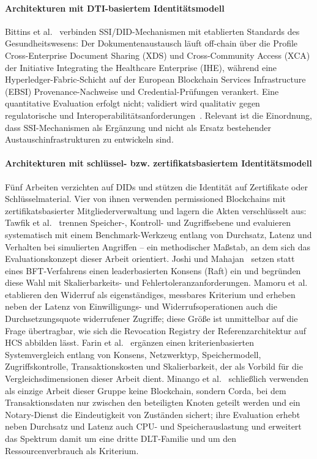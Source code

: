 \paragraph{Architekturen mit DTI-basiertem Identitätsmodell}
\label{par:literatur_dti}

Bittins et al.~\cite{bittins2021} verbinden SSI/DID-Mechanismen mit etablierten Standards des Gesundheitswesens: Der Dokumentenaustausch läuft off-chain über die Profile Cross-Enterprise Document Sharing (XDS) und Cross-Community Access (XCA) der Initiative Integrating the Healthcare Enterprise (IHE), während eine Hyperledger-Fabric-Schicht auf der European Blockchain Services Infrastructure (EBSI) Provenance-Nachweise und Credential-Prüfungen verankert. Eine quantitative Evaluation erfolgt nicht; validiert wird qualitativ gegen regulatorische und Interoperabilitätsanforderungen~\cite{bittins2021}. Relevant ist die Einordnung, dass SSI-Mechanismen als Ergänzung und nicht als Ersatz bestehender Austauschinfrastrukturen zu entwickeln sind.

\paragraph{Architekturen mit schlüssel- bzw. zertifikatsbasiertem Identitätsmodell}
\label{par:literatur_schluessel}

Fünf Arbeiten verzichten auf DIDs und stützen die Identität auf Zertifikate oder Schlüsselmaterial. Vier von ihnen verwenden permissioned Blockchains mit zertifikatsbasierter Mitgliederverwaltung und lagern die Akten verschlüsselt aus: Tawfik et al.~\cite{tawfik2025} trennen Speicher-, Kontroll- und Zugriffsebene und evaluieren systematisch mit einem Benchmark-Werkzeug entlang von Durchsatz, Latenz und Verhalten bei simulierten Angriffen -- ein methodischer Maßstab, an dem sich das Evaluationskonzept dieser Arbeit orientiert. Joshi und Mahajan~\cite{joshimahajan2025} setzen statt eines BFT-Verfahrens einen leaderbasierten Konsens (Raft) ein und begründen diese Wahl mit Skalierbarkeits- und Fehlertoleranzanforderungen. Mamoru et al.~\cite{mamoru2026} etablieren den Widerruf als eigenständiges, messbares Kriterium und erheben neben der Latenz von Einwilligungs- und Widerrufsoperationen auch die Durchsetzungsquote widerrufener Zugriffe; diese Größe ist unmittelbar auf die Frage übertragbar, wie sich die Revocation Registry der Referenzarchitektur auf HCS abbilden lässt. Farin et al.~\cite{farin2025} ergänzen einen kriterienbasierten Systemvergleich entlang von Konsens, Netzwerktyp, Speichermodell, Zugriffskontrolle, Transaktionskosten und Skalierbarkeit, der als Vorbild für die Vergleichsdimensionen dieser Arbeit dient. Minango et al.~\cite{minango2025} schließlich verwenden als einzige Arbeit dieser Gruppe keine Blockchain, sondern Corda, bei dem Transaktionsdaten nur zwischen den beteiligten Knoten geteilt werden und ein Notary-Dienst die Eindeutigkeit von Zuständen sichert; ihre Evaluation erhebt neben Durchsatz und Latenz auch CPU- und Speicherauslastung und erweitert das Spektrum damit um eine dritte DLT-Familie und um den Ressourcenverbrauch als Kriterium.

